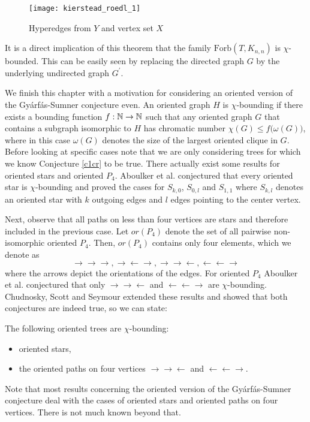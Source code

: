 \begin{figure}[ht]
\begin{center}
\texttt{[image: kierstead\_roedl\_1]}
\end{center}
\caption{Hyperedges from $Y$ and vertex set $X$}
\label{f4cr}
\end{figure}

\begin{note}
It is a direct implication of this theorem that the family $\text{Forb}(T,K_{n,n})$ is $\chi$-bounded. This can be easily seen by replacing the directed graph $G$ by the underlying undirected graph $G^\prime$.
\end{note}

We finish this chapter with a motivation for considering an oriented version of the Gyárfás-Sumner conjecture even. An oriented graph $H$ is $\chi$-bounding if there exists a bounding function $f:\mathbb{N}\to\mathbb{N}$ such that any oriented graph $G$ that contains a subgraph isomorphic to $H$ has chromatic number $\chi (G)\leq f\big(\omega (G)\big)$, where in this case $\omega (G)$ denotes the size of the largest oriented clique in $G$. Before looking at specific cases note that we are only considering trees for which we know Conjecture \ref{c1cr} to be true. There actually exist some results for oriented stars and oriented $P_4$. Aboulker et al. \cite{Ab16} conjectured that every oriented star is $\chi$-bounding and proved the cases for $S_{k,0}$, $S_{0,l}$ and $S_{1,1}$ where $S_{k,l}$ denotes an oriented star with $k$ outgoing edges and $l$ edges pointing to the center vertex. 

Next, observe that all paths on less than four vertices are stars and therefore included in the previous case. Let $or(P_4)$ denote the set of all pairwise non-isomorphic oriented $P_4$. Then, $or(P_4)$ contains only four elements, which we denote as \[\rightarrow\rightarrow\rightarrow , \rightarrow\leftarrow\rightarrow , \rightarrow\rightarrow\leftarrow , \leftarrow\leftarrow\rightarrow\] where the arrows depict the orientations of the edges. For oriented $P_4$ Aboulker et al. \cite{Ab16} conjectured that only $\rightarrow\rightarrow\leftarrow$ and $\leftarrow\leftarrow\rightarrow$ are $\chi$-bounding. Chudnosky, Scott and Seymour \cite{CSS17b} extended these results and showed that both conjectures are indeed true, so we can state:

\begin{thm}
The following oriented trees are $\chi$-bounding:
\begin{itemize}
\item oriented stars,
\item the oriented paths on four vertices $\rightarrow\rightarrow\leftarrow$ and $\leftarrow\leftarrow\rightarrow$.
\end{itemize}
\end{thm}

Note that most results concerning the oriented version of the Gyárfás-Sumner conjecture deal with the cases of oriented stars and oriented paths on four vertices. There is not much known beyond that.